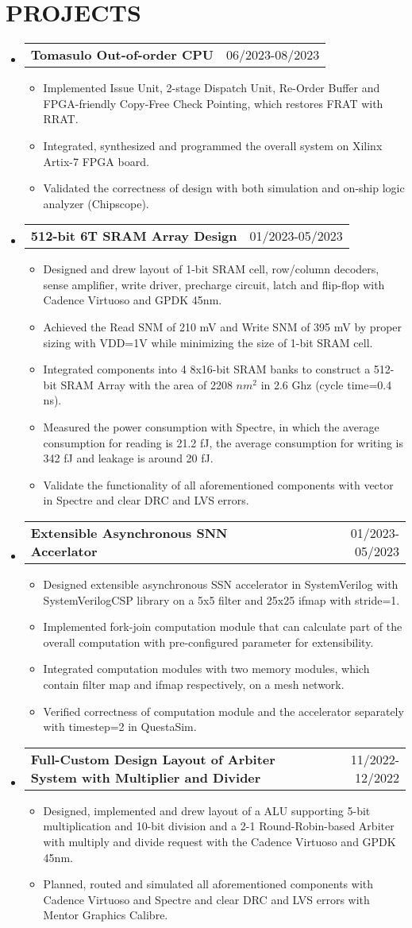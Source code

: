 \documentclass[letterpaper,11pt]{article}
\makeatletter
\newcommand{\resumeItemOne}[1]{
  \item\small{#1}
}
\newcommand{\resumeSubheadingNoTitle}[2]{
  \vspace{-1pt}\item
    \begin{tabular*}{0.97\textwidth}[t]{l@{\extracolsep{\fill}}r}
      \textbf{#1} & #2 %
    \end{tabular*}\vspace{-5pt}
}
\newcommand{\resumeSubHeadingListStart}{\begin{itemize}[leftmargin=*]}
\newcommand{\resumeSubHeadingListEnd}{\end{itemize}\vspace{-5pt}}
\newcommand{\resumeItemListStart}{\begin{itemize}}
\newcommand{\resumeItemListEnd}{\end{itemize}\vspace{-10pt}}
\makeatother
\begin{document}
\section{PROJECTS}
\resumeSubHeadingListStart
\resumeSubheadingNoTitle
    {Tomasulo Out-of-order CPU}{06/2023-08/2023}
\resumeItemListStart
	\resumeItemOne{Implemented Issue Unit, 2-stage Dispatch Unit, Re-Order Buffer and FPGA-friendly Copy-Free Check Pointing, which restores FRAT with RRAT.}
	\resumeItemOne{Integrated, synthesized and programmed the overall system on Xilinx Artix-7 FPGA board.}
	\resumeItemOne{Validated the correctness of design with both simulation and on-ship logic analyzer (Chipscope).}
\resumeItemListEnd
\resumeSubheadingNoTitle
    {512-bit 6T SRAM Array Design}{01/2023-05/2023}
\resumeItemListStart
	\resumeItemOne{Designed and drew layout of 1-bit SRAM cell, row/column decoders, sense amplifier, write driver, precharge circuit, latch and flip-flop with Cadence Virtuoso and GPDK 45nm.}
	\resumeItemOne{Achieved the Read SNM of 210 mV and Write SNM of 395 mV by proper sizing with VDD=1V while minimizing the size of 1-bit SRAM cell.}
	\resumeItemOne{Integrated components into 4 8x16-bit SRAM banks to construct a 512-bit SRAM Array with the area of 2208 $nm^2$ in 2.6 Ghz (cycle time=0.4 ns).}
	\resumeItemOne{Measured the power consumption with Spectre, in which the average consumption for reading is 21.2 fJ, the average consumption for writing is 342 fJ and leakage is around 20 fJ.}
	\resumeItemOne{Validate the functionality of all aforementioned components with vector in Spectre and clear DRC and LVS errors.}
\resumeItemListEnd
\resumeSubheadingNoTitle
    {Extensible Asynchronous SNN Accerlator}{01/2023-05/2023}
\resumeItemListStart
	\resumeItemOne{Designed extensible asynchronous SSN accelerator in SystemVerilog with SystemVerilogCSP library on a 5x5 filter and 25x25 ifmap with stride=1.}
	\resumeItemOne{Implemented fork-join computation module that can calculate part of the overall computation with pre-configured parameter for extensibility.}
	\resumeItemOne{Integrated computation modules with two memory modules, which contain filter map and ifmap respectively, on a mesh network.}
	\resumeItemOne{Verified correctness of computation module and the accelerator separately with timestep=2 in QuestaSim.}
\resumeItemListEnd
\resumeSubheadingNoTitle
    {Full-Custom Design Layout of Arbiter System with Multiplier and Divider}{11/2022-12/2022}
\resumeItemListStart
	\resumeItemOne{Designed, implemented and drew layout of a ALU supporting 5-bit multiplication and 10-bit division and a 2-1 Round-Robin-based Arbiter with multiply and divide request with the Cadence Virtuoso and GPDK 45nm.}
	\resumeItemOne{Planned, routed and simulated all aforementioned components with Cadence Virtuoso and Spectre and clear DRC and LVS errors with Mentor Graphics Calibre.}
\resumeItemListEnd
\resumeSubHeadingListEnd
\end{document}
